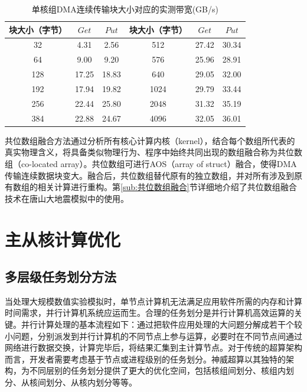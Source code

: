 \documentclass[degree=doctor]{thuthesis}
\begin{document}
\begin{table}[thb]
\caption{单核组DMA连续传输块大小对应的实测带宽(GB/s)}
\label{tab:sw26010_dmabw}
\centering
\begin{tabular}{|c|c|c||c|c|c|}
  \hline
  块大小（字节） & $Get$ & $Put$ & 块大小（字节） & $Get$ & $Put$ \\
  \hline
  32&4.31&2.56& 512&27.42&30.34\\
  \hline
  64&9.00&9.20& 576&25.96&28.91\\
  \hline
  128&17.25&18.83& 640&29.05&32.00\\
  \hline
  192&17.94&19.82& 1024&29.79&33.44\\
  \hline
  256&22.44&25.80& 2048&31.32&35.19\\
  \hline
  384&22.88&24.67& 4096&32.05&36.01\\
  \hline
\end{tabular}
\end{table}

共位数组融合方法通过分析所有核心计算内核（kernel），结合每个数组所代表的真实物理含义，将具备类似物理行为、程序中始终共同出现的数组融合称为共位数组（co-located array）。共位数组可进行AOS（array of struct）融合，使得DMA传输连续数据块变大。融合后，共位数组替代原有的独立数组，并对所有涉及到原有数组的相关计算进行重构。第\ref{sub:共位数组融合}节详细地介绍了共位数组融合技术在唐山大地震模拟中的使用。


\section{主从核计算优化}

\subsection{多层级任务划分方法}

当处理大规模数值实验模拟时，单节点计算机无法满足应用软件所需的内存和计算时间需求，并行计算机系统应运而生。合理的任务划分是并行计算机高效运算的关键。并行计算处理的基本流程如下：通过把软件应用处理的大问题分解成若干个较小问题，分别派发到并行计算机的不同节点上参与运算，必要时在不同节点间通过网络进行数据交换，计算完毕后，将结果汇集到主计算节点。对于传统的超算架构而言，开发者需要考虑基于节点或进程级别的任务划分。神威超算以其独特的架构，为不同层别的任务划分提供了更大的优化空间，包括核组间划分、核组内划分、从核间划分、从核内划分等等。
\end{document}
